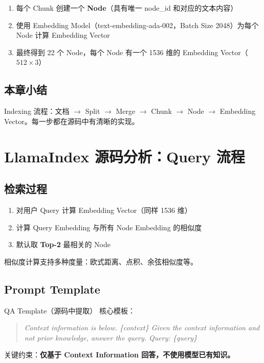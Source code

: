 \documentclass[a4paper]{article}
\begin{document}
\begin{enumerate}
    \item 每个 Chunk 创建一个 \textbf{Node}（具有唯一 node\_id 和对应的文本内容）
    \item 使用 Embedding Model（text-embedding-ada-002，Batch Size 2048）为每个 Node 计算 Embedding Vector
    \item 最终得到 22 个 Node，每个 Node 有一个 1536 维的 Embedding Vector（$512 \times 3$）
\end{enumerate}

\subsection{本章小结}

Indexing 流程：文档 $\rightarrow$ Split $\rightarrow$ Merge $\rightarrow$ Chunk $\rightarrow$ Node $\rightarrow$ Embedding Vector。每一步都在源码中有清晰的实现。

\section{LlamaIndex 源码分析：Query 流程}

\subsection{检索过程}

\begin{enumerate}
    \item 对用户 Query 计算 Embedding Vector（同样 1536 维）
    \item 计算 Query Embedding 与所有 Node Embedding 的相似度
    \item 默认取 \textbf{Top-2} 最相关的 Node
\end{enumerate}

相似度计算支持多种度量：欧式距离、点积、余弦相似度等。

\subsection{Prompt Template}

\begin{importantbox}{QA Template（源码中提取）}
核心模板：
\begin{quote}
\textit{Context information is below. \{context\} Given the context information and not prior knowledge, answer the query. Query: \{query\}}
\end{quote}
关键约束：\textbf{仅基于 Context Information 回答，不使用模型已有知识。}
\end{importantbox}
\end{document}
